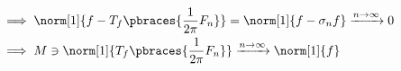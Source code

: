 \begin{solution}
\begin{enumerate}[label = \arabic*.]

    \begin{align*}
        & \implies
        \norm[1]
        {
            f
            -
            T_f
            \pbraces
            {
                \frac{1}{2 \pi}
                F_n
            }
        }
        =
        \norm[1]{f - \sigma_n f}
        \xrightarrow[]{n \to \infty}
        0 \\
        & \implies
        M
        \ni
        \norm[1]
        {
            T_f
            \pbraces
            {
                \frac{1}{2 \pi}
                F_n
            }
        }
        \xrightarrow[]{n \to \infty}
        \norm[1]{f}
    \end{align*}

\end{enumerate}

\end{solution}

